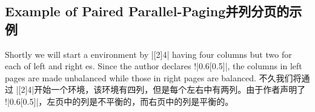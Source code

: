  
 \newpage
 \subsection{Example of Paired Parallel-Paging\hfill 并列分页的示例}
 \label{sec:ppts-paired}
\begin{paracol}{2}
Shortly we will start a  environment by \beginparacol|[2]{4}|
having four columns but two for each of left and right \paired{}
\parapag{}es.  Since the author declares \!\columnratio!|{0.6}[0.5]|, the
columns in left pages are made unbalanced while those in right pages are
balanced.
\switchcolumn
不久我们将通过 \beginparacol|[2]{4}|开始一个环境，该环境有四列，但是每个左右\paired{}\parapag{}中有两列。由于作者声明了 \!\columnratio!|{0.6}[0.5]|，左页中的列是不平衡的，而右页中的列是平衡的。
\end{paracol} 

